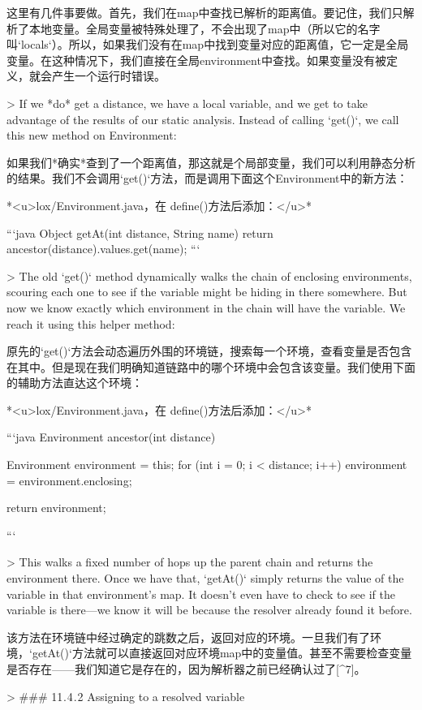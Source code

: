 \documentclass[cn,11pt,chinese]{elegantbook}
\begin{document}
{{{{{{{{{{{{{{这里有几件事要做。首先，我们在map中查找已解析的距离值。要记住，我们只解析了本地变量。全局变量被特殊处理了，不会出现了map中（所以它的名字叫`locals`）。所以，如果我们没有在map中找到变量对应的距离值，它一定是全局变量。在这种情况下，我们直接在全局environment中查找。如果变量没有被定义，就会产生一个运行时错误。

> If we *do* get a distance, we have a local variable, and we get to take advantage of the results of our static analysis. Instead of calling `get()`, we call this new method on Environment:

如果我们*确实*查到了一个距离值，那这就是个局部变量，我们可以利用静态分析的结果。我们不会调用`get()`方法，而是调用下面这个Environment中的新方法：

*<u>lox/Environment.java，在 define()方法后添加：</u>*

```java
  Object getAt(int distance, String name) {
    return ancestor(distance).values.get(name);
  }
```

> The old `get()` method dynamically walks the chain of enclosing environments, scouring each one to see if the variable might be hiding in there somewhere. But now we know exactly which environment in the chain will have the variable. We reach it using this helper method:

原先的`get()`方法会动态遍历外围的环境链，搜索每一个环境，查看变量是否包含在其中。但是现在我们明确知道链路中的哪个环境中会包含该变量。我们使用下面的辅助方法直达这个环境：

*<u>lox/Environment.java，在 define()方法后添加：</u>*

```java
  Environment ancestor(int distance) {
    Environment environment = this;
    for (int i = 0; i < distance; i++) {
      environment = environment.enclosing; 
    }

    return environment;
  }
```

> This walks a fixed number of hops up the parent chain and returns the environment there. Once we have that, `getAt()` simply returns the value of the variable in that environment’s map. It doesn’t even have to check to see if the variable is there—we know it will be because the resolver already found it before.

该方法在环境链中经过确定的跳数之后，返回对应的环境。一旦我们有了环境，`getAt()`方法就可以直接返回对应环境map中的变量值。甚至不需要检查变量是否存在——我们知道它是存在的，因为解析器之前已经确认过了[^7]。

> ### 11 . 4 . 2 Assigning to a resolved variable

}}}}}}}}}}}}}}
\end{document}
